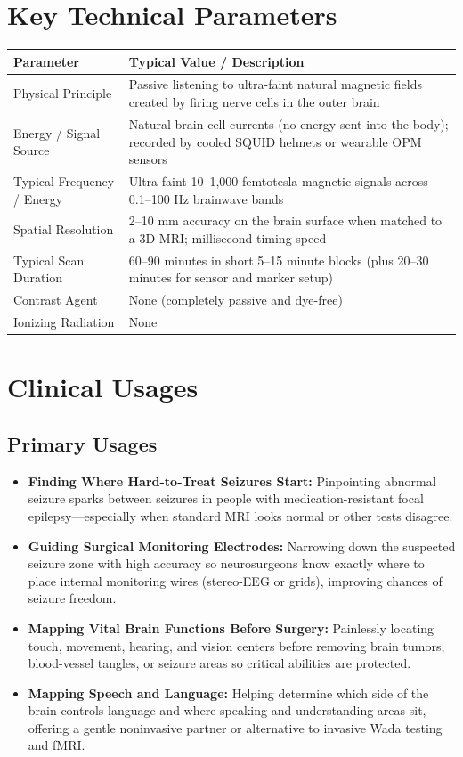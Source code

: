 \section{Key Technical Parameters}
\noindent
\begin{tabularx}{\textwidth}{@{}l X@{}}
\toprule
\textbf{Parameter} & \textbf{Typical Value / Description} \\
\midrule
Physical Principle & Passive listening to ultra-faint natural magnetic fields created by firing nerve cells in the outer brain \\
Energy / Signal Source & Natural brain-cell currents (no energy sent into the body); recorded by cooled SQUID helmets or wearable OPM sensors \\
Typical Frequency / Energy & Ultra-faint 10--1,000 femtotesla magnetic signals across 0.1--100 Hz brainwave bands \\
Spatial Resolution & 2--10 mm accuracy on the brain surface when matched to a 3D MRI; millisecond timing speed \\
Typical Scan Duration & 60--90 minutes in short 5--15 minute blocks (plus 20--30 minutes for sensor and marker setup) \\
Contrast Agent & None (completely passive and dye-free) \\
Ionizing Radiation & None \\
\bottomrule
\end{tabularx}

\section{Clinical Usages}

\subsection{Primary Usages}
\begin{itemize}
  \item \textbf{Finding Where Hard-to-Treat Seizures Start:} Pinpointing abnormal seizure sparks between seizures in people with medication-resistant focal epilepsy---especially when standard MRI looks normal or other tests disagree.
  \item \textbf{Guiding Surgical Monitoring Electrodes:} Narrowing down the suspected seizure zone with high accuracy so neurosurgeons know exactly where to place internal monitoring wires (stereo-EEG or grids), improving chances of seizure freedom.
  \item \textbf{Mapping Vital Brain Functions Before Surgery:} Painlessly locating touch, movement, hearing, and vision centers before removing brain tumors, blood-vessel tangles, or seizure areas so critical abilities are protected.
  \item \textbf{Mapping Speech and Language:} Helping determine which side of the brain controls language and where speaking and understanding areas sit, offering a gentle noninvasive partner or alternative to invasive Wada testing and fMRI.
\end{itemize}

